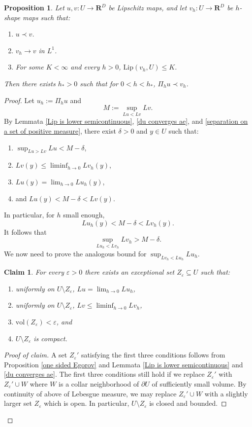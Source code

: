 \documentclass[reqno,11pt]{amsart}
\newcommand{\RR}{\mathbf{R}}
\newcommand{\vol}{\mathrm{vol}}
\newcommand{\Lip}{\mathrm{Lip}}
\newtheorem{proposition}[theorem]{Proposition}
\newtheorem{claim}{Claim}[theorem]
\theoremstyle{definition}
\numberwithin{equation}{section}
\begin{document}
\begin{proposition}\label{discrete tight maps converge}
Let $u, v: U \to \RR^D$ be Lipschitz maps, and let $v_h: U \to \RR^D$ be $h$-shape maps such that:
\begin{enumerate}
\item $u \prec v$.
\item $v_h \to v$ in $L^1$.
\item For some $K < \infty$ and every $h > 0$, $\Lip(v_h, U) \leq K$.
\end{enumerate}
Then there exists $h_* > 0$ such that for $0 < h < h_*$, $\Pi_h u \prec v_h$.
\end{proposition}
\begin{proof}
Let $u_h := \Pi_h u$ and
$$M := \sup_{Lu < Lv} Lv.$$
By Lemmata \ref{Lip is lower semicontinuous}, \ref{du converges ae}, and \ref{separation on a set of positive measure}, there exist $\delta > 0$ and $y \in U$ such that:
\begin{enumerate}
\item $\sup_{Lu > Lv} Lu < M - \delta$,
\item $Lv(y) \leq \liminf_{h \to 0} Lv_h(y)$,
\item $Lu(y) = \lim_{h \to 0} Lu_h(y)$,
\item and $Lu(y) < M - \delta < Lv(y)$.
\end{enumerate}
In particular, for $h$ small enough, 
$$Lu_h(y) < M - \delta < Lv_h(y).$$
It follows that 
\begin{equation}\label{tight convergence RHS}
\sup_{Lu_h < Lv_h} Lv_h > M - \delta.
\end{equation}
We now need to prove the analogous bound for $\sup_{Lv_h < Lu_h} Lu_h$.

\begin{claim}\label{tight convergence exceptional set}
For every $\varepsilon > 0$ there exists an exceptional set $Z_\varepsilon \subseteq U$ such that:
\begin{enumerate}
\item uniformly on $U \setminus Z_\varepsilon$, $Lu = \lim_{h \to 0} Lu_h$,
\item uniformly on $U \setminus Z_\varepsilon$, $Lv \leq \liminf_{h \to 0} Lv_h$,
\item $\vol(Z_\varepsilon) < \varepsilon$, and
\item $U \setminus Z_\varepsilon$ is compact.
\end{enumerate}
\end{claim}
\begin{proof}[Proof of claim]
A set $Z_\varepsilon'$ satisfying the first three conditions follows from Proposition \ref{one sided Egorov} and Lemmata \ref{Lip is lower semicontinuous} and \ref{du converges ae}.
The first three conditions still hold if we replace $Z_\varepsilon'$ with $Z_\varepsilon' \cup W$ where $W$ is a collar neighborhood of $\partial U$ of sufficiently small volume.
By continuity of above of Lebesgue measure, we may replace $Z_\varepsilon' \cup W$ with a slightly larger set $Z_\varepsilon$ which is open.
In particular, $U \setminus Z_\varepsilon$ is closed and bounded.
\end{proof}


\end{proof}
\end{document}

